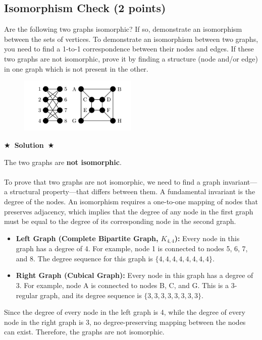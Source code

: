 \documentclass{article}
\numberwithin{figure}{section}
\newcommand{\Solution}[1]{%
	{%
		\medskip
		\color{red}
		\bf $\bigstar$~\sf\textbf{Solution}~$\bigstar$ \sf
		#1
	}
	\bigskip
}
\begin{document}
	\subsection{Isomorphism Check (2 points)}
	Are the following two graphs isomorphic? If so, demonstrate an isomorphism
	between the sets of vertices. To demonstrate an isomorphism between two
	graphs, you need to find a 1-to-1 correspondence between their nodes and edges.
	If these two graphs are not isomorphic, prove it by finding a structure (node
	and/or edge) in one graph which is not present in the other. 
	\begin{figure}[H]
		\centering
		\includegraphics[width=0.5\textwidth]{fig1.png}
		\label{fig:my_label2}
	\end{figure}
	
	\Solution{
		The two graphs are \textbf{not isomorphic}.
		\\
		\\
		To prove that two graphs are not isomorphic, we need to find a graph invariant—a structural property—that differs between them. A fundamental invariant is the degree of the nodes. An isomorphism requires a one-to-one mapping of nodes that preserves adjacency, which implies that the degree of any node in the first graph must be equal to the degree of its corresponding node in the second graph.
		
		\begin{itemize}
			\item \textbf{Left Graph (Complete Bipartite Graph, $K_{4,4}$):}
			Every node in this graph has a degree of 4. For example, node 1 is connected to nodes 5, 6, 7, and 8. The degree sequence for this graph is $\{4, 4, 4, 4, 4, 4, 4, 4\}$.
			
			\item \textbf{Right Graph (Cubical Graph):}
			Every node in this graph has a degree of 3. For example, node A is connected to nodes B, C, and G. This is a 3-regular graph, and its degree sequence is $\{3, 3, 3, 3, 3, 3, 3, 3\}$.
		\end{itemize}
		
		Since the degree of every node in the left graph is 4, while the degree of every node in the right graph is 3, no degree-preserving mapping between the nodes can exist. Therefore, the graphs are not isomorphic.
	}
	
\end{document}
